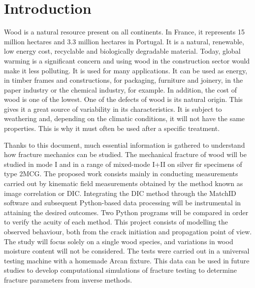 
\chapter{Introduction} %

\label{Introduction} %


Wood is a natural resource present on all continents. In France, it represents 15 million hectares and 3.3 million hectares in Portugal. It is a natural, renewable, low energy cost, recyclable and biologically degradable material. Today, global warming is a significant concern and using wood in the construction sector would make it less polluting. It is used for many applications. It can be used as energy, in timber frames and constructions, for packaging, furniture and joinery, in the paper industry or the chemical industry, for example. In addition, the cost of wood is one of the lowest. One of the defects of wood is its natural origin. This gives it a great source of variability in its characteristics. It is subject to weathering and, depending on the climatic conditions, it will not have the same properties. This is why it must often be used after a specific treatment.

Thanks to this document, much essential information is gathered to understand how fracture mechanics can be studied. The mechanical fracture of wood will be studied in mode I and in a range of mixed-mode I+II on silver fir specimens of type 2MCG. The proposed work consists mainly in conducting measurements carried out by kinematic field measurements obtained by the method known as image correlation or DIC. Integrating the DIC method through the MatchID software and subsequent Python-based data processing will be instrumental in attaining the desired outcomes. Two Python programs will be compared in order to verify the acuity of each method. This project consists of modelling the observed behaviour, both from the crack initiation and propagation point of view. The study will focus solely on a single wood species, and variations in wood moisture content will not be considered. The tests were carried out in a universal testing machine with a homemade Arcan fixture. This data can be used in future studies to develop computational simulations of fracture testing to determine fracture parameters from inverse methods.

